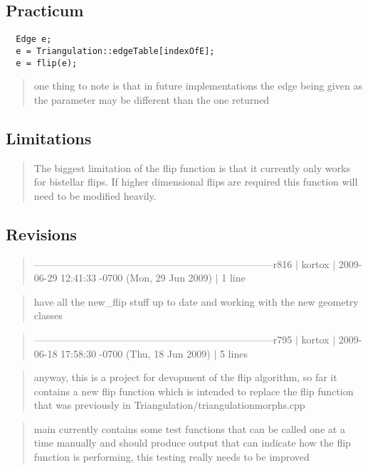 \documentclass[10pt]{article}%
\begin{document}
\subsection*{Practicum}

\begin{quotation} \end{quotation}{\small{\begin{verbatim} 
  Edge e;
  e = Triangulation::edgeTable[indexOfE];
  e = flip(e);
\end{verbatim}
}}
\begin{quotation} one thing to note is that in future implementations the edge being given as the parameter may be different than the one returned\end{quotation}

\subsection*{Limitations}

\begin{quotation} The biggest limitation of the flip function is that it currently only works for bistellar flips. If higher dimensional flips are required this function will need to be modified heavily.\end{quotation}

\subsection*{Revisions}

\begin{quotation} ------------------------------------------------------------------------r816 \mbox{$|$} kortox \mbox{$|$} 2009-06-29 12:41:33 -0700 (Mon, 29 Jun 2009) \mbox{$|$} 1 line\end{quotation}
\begin{quotation} have all the new\_flip stuff up to date and working with the new geometry classes\end{quotation}
\begin{quotation} ------------------------------------------------------------------------r795 \mbox{$|$} kortox \mbox{$|$} 2009-06-18 17:58:30 -0700 (Thu, 18 Jun 2009) \mbox{$|$} 5 lines\end{quotation}
\begin{quotation} anyway, this is a project for devopment of the flip algorithm, so far it contains a new flip function which is intended to replace the flip function that was previously in Triangulation/triangulationmorphs.cpp\end{quotation}
\begin{quotation} main currently contains some test functions that can be called one at a time manually and should produce output that can indicate how the flip function is performing, this testing really needs to be improved\end{quotation}
\end{document}
